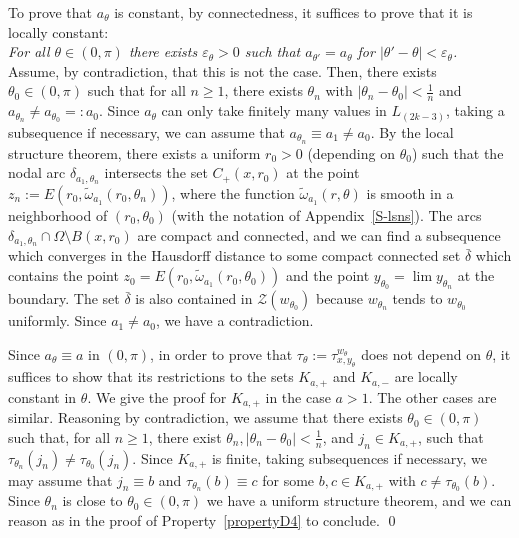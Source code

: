 \documentclass[12pt,a4paper]{amsart}
\theoremstyle{plain} %
\theoremstyle{definition}
\numberwithin{equation}{section}
\numberwithin{figure}{section}
\numberwithin{table}{section}
\newcommand{\cZ}{\mathcal{Z}}
\newcommand{\sm}{\!\setminus\!}
\newcommand{\omegat}{\widetilde{\omega}}
\begin{document}
{To prove that $a_{\theta}$ is constant, by connectedness, it suffices to prove that it is locally constant:\\ {\it For all $\theta \in (0,\pi)$ there exists $\varepsilon_{\theta} > 0$ such that $a_{\theta'} = a_{\theta}$ for $|\theta' - \theta| < \varepsilon_{\theta}$.} \\
Assume, by contradiction, that this is not the case. Then, there exists $\theta_0 \in (0,\pi)$ such that for all $n \ge 1$, there exists $\theta_n$ with $|\theta_n - \theta_0| < \frac 1n$ and $a_{\theta_n} \not = a_{\theta_0} =: a_0$. Since $a_{\theta}$ can only take finitely many values in $ L_{(2k-3)}$, taking a subsequence if necessary, we can assume that $a_{\theta_n} \equiv a_1 \not = a_0$. By the local structure theorem, there exists a uniform $r_0 > 0$ (depending on $\theta_0$) such that the nodal arc $ \delta_{a_1,\theta_n}$ intersects the   set $C_{+}(x,r_0)$ at the point $z_n := E\left( r_0, \omegat_{a_1}(r_0,\theta_n) \right)$, where the function $\omegat_{a_1}(r,\theta)$ is smooth in a neighborhood of $(r_0,\theta_0)$ (with the notation of Appendix~\ref{S-lsns}). The arcs $\delta_{a_1,\theta_n} \cap \Omega\sm B(x,r_0)$ are compact and connected, and we can find a subsequence which converges in the Hausdorff distance to some compact connected set $\bar{\delta}$ which contains the point $z_0 = E\left( r_0, \omegat_{a_1}(r_0,\theta_0) \right)$ and the point $y_{\theta_0} = \lim y_{\theta_n}$ at the boundary. The set $\bar{\delta}$ is also contained in $\cZ(w_{\theta_0})$ because $w_{\theta_n}$ tends to $w_{\theta_0}$ uniformly. Since $a_1 \not = a_0$, we have a contradiction.\smallskip

Since $a_{\theta} \equiv a$ in $(0,\pi)$, in order to prove that $\tau_{\theta} := \tau_{x,y_{\theta}}^{w_{\theta}}$ does not depend on $\theta$, it suffices to show that its restrictions to the sets $K_{a,+}$ and $K_{a,-}$ are locally constant in $\theta$. We give the proof for $K_{a,+}$ in the case $a > 1$. The other cases are similar. Reasoning by contradiction, we assume that there exists $\theta_0 \in (0,\pi)$ such that, for all $n \ge 1$, there exist $\theta_n, |\theta_n-\theta_0| < \frac 1n$, and $j_n \in K_{a,+}$, such that $\tau_{\theta_n}(j_n) \not = \tau_{\theta_0}(j_n)$. Since $K_{a,+}$ is finite, taking subsequences if necessary, we may assume that $j_n \equiv b$ and $\tau_{\theta_n}(b) \equiv c$ for some $b,c \in K_{a,+}$ with $c\not = \tau_{\theta_0}(b)$. Since $\theta_n$ is close to $\theta_0 \in (0,\pi)$ we have a uniform structure theorem, and we can reason as in the proof of Property~\ref{propertyD4} to conclude. \hfill \qed\medskip

}
\end{document}
